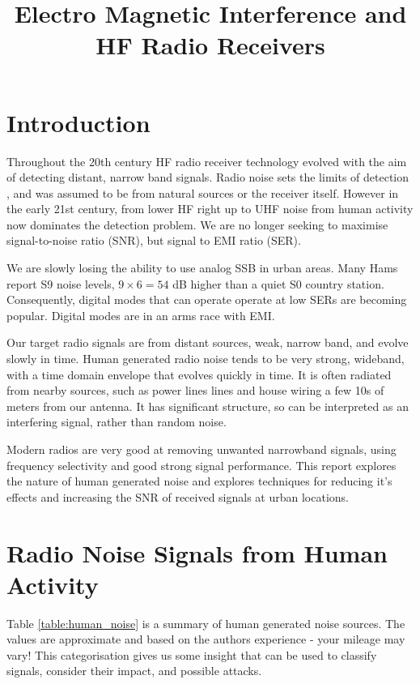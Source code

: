 \documentclass{article}
\begin{document}
\title{Electro Magnetic Interference and HF Radio Receivers}
\maketitle

\section{Introduction}
 
Throughout the 20th century HF radio receiver technology evolved with the aim of detecting distant, narrow band signals.  Radio noise sets the limits of detection \cite{itu372}, and was assumed to be from natural sources or the receiver itself. However in the early 21st century, from lower HF right up to UHF noise from human activity now dominates the detection problem.  We are no longer seeking to maximise signal-to-noise ratio (SNR), but signal to EMI ratio (SER).

We are slowly losing the ability to use analog SSB in urban areas.  Many Hams report S9 noise levels, $9 \times 6 = 54$ dB higher than a quiet S0 country station.  Consequently, digital modes that can operate operate at low SERs are becoming popular.  Digital modes are in an arms race with EMI.

Our target radio signals are from distant sources, weak, narrow band, and evolve slowly in time. Human generated radio noise tends to be very strong, wideband, with a time domain envelope that evolves quickly in time.  It is often radiated from nearby sources, such as power lines lines and house wiring a few 10s of meters from our antenna.  It has significant structure, so can be interpreted as an interfering signal, rather than random noise.

Modern radios are very good at removing unwanted narrowband signals, using frequency selectivity and good strong signal performance.  This report explores the nature of human generated noise and explores techniques for reducing it's effects and increasing the SNR of received signals at urban locations.

\section{Radio Noise Signals from Human Activity}

Table \ref{table:human_noise} is a summary of human generated noise sources.  The values are approximate and based on the authors experience - your mileage may vary!  This categorisation gives us some insight that can be used to classify signals, consider their impact, and possible attacks.
\end{document}
